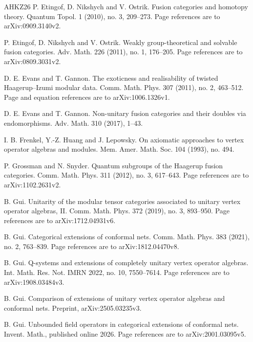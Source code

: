 \documentclass[leqno]{article}
\numberwithin{equation}{section}
\begin{document}
\begin{thebibliography}{AHKZ26}
P. Etingof, D. Nikshych and V. Ostrik.
\newblock Fusion categories and homotopy theory.
\newblock Quantum Topol. 1 (2010), no. 3, 209--273. Page references are to arXiv:0909.3140v2.

P. Etingof, D. Nikshych and V. Ostrik.
\newblock Weakly group-theoretical and solvable fusion categories.
\newblock Adv. Math. 226 (2011), no. 1, 176--205. Page references are to arXiv:0809.3031v2.

D. E. Evans and T. Gannon.
\newblock The exoticness and realisability of twisted Haagerup--Izumi modular data.
\newblock Comm. Math. Phys. 307 (2011), no. 2, 463--512. Page and equation references are to arXiv:1006.1326v1.

D. E. Evans and T. Gannon.
\newblock Non-unitary fusion categories and their doubles via endomorphisms.
\newblock Adv. Math. 310 (2017), 1--43.

I. B. Frenkel, Y.-Z. Huang and J. Lepowsky.
\newblock On axiomatic approaches to vertex operator algebras and modules.
\newblock Mem. Amer. Math. Soc. 104 (1993), no. 494.

P. Grossman and N. Snyder.
\newblock Quantum subgroups of the Haagerup fusion categories.
\newblock Comm. Math. Phys. 311 (2012), no. 3, 617--643. Page references are to arXiv:1102.2631v2.

B. Gui.
\newblock Unitarity of the modular tensor categories associated to unitary vertex operator algebras, II.
\newblock Comm. Math. Phys. 372 (2019), no. 3, 893--950. Page references are to arXiv:1712.04931v6.

B. Gui.
\newblock Categorical extensions of conformal nets.
\newblock Comm. Math. Phys. 383 (2021), no. 2, 763--839. Page references are to arXiv:1812.04470v8.

B. Gui.
\newblock Q-systems and extensions of completely unitary vertex operator algebras.
\newblock Int. Math. Res. Not. IMRN 2022, no. 10, 7550--7614. Page references are to arXiv:1908.03484v3.

B. Gui.
\newblock Comparison of extensions of unitary vertex operator algebras and conformal nets.
\newblock Preprint, arXiv:2505.03235v3.

B. Gui.
\newblock Unbounded field operators in categorical extensions of conformal nets.
\newblock Invent. Math., published online 2026. Page references are to arXiv:2001.03095v5.


\end{thebibliography}
\end{document}
